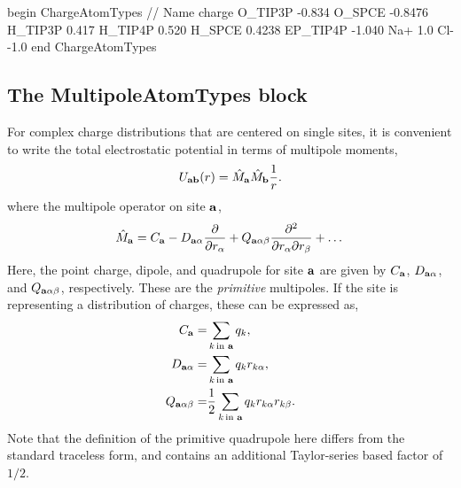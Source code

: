 \documentclass[]{book}
\begin{document}
\begin{code}[caption={[An example of a ChargeAtomTypes block.] A
simple example of a ChargeAtomTypes block.   Units for
charge are in multiples of electron charge.},
label={sch:ChargeAtomTypesBlock}]
begin ChargeAtomTypes
// Name         charge
O_TIP3P        -0.834
O_SPCE         -0.8476
H_TIP3P         0.417
H_TIP4P         0.520
H_SPCE          0.4238
EP_TIP4P       -1.040
Na+             1.0
Cl-            -1.0
end ChargeAtomTypes
\end{code}

\subsection{\label{section:ffMultipole}The MultipoleAtomTypes
  block}
For complex charge distributions that are centered on single sites, it
is convenient to write the total electrostatic potential in terms of
multipole moments,
\begin{equation}
U_{\bf{ab}}(r)=\hat{M}_{\bf a} \hat{M}_{\bf b} \frac{1}{r}  \label{kernel}.
\end{equation}
where the multipole operator on site $\bf a$,
\begin{equation}
\hat{M}_{\bf a} = C_{\bf a} - D_{{\bf a}\alpha} \frac{\partial}{\partial r_{\alpha}} 
+  Q_{{\bf a}\alpha\beta}
 \frac{\partial^2}{\partial r_{\alpha} \partial r_{\beta}} + \dots
\end{equation}
Here, the point charge, dipole, and quadrupole for site $\bf a$ are
given by $C_{\bf a}$, $D_{{\bf a}\alpha}$, and $Q_{{\bf
    a}\alpha\beta}$, respectively.  These are the {\it primitive}
multipoles.  If the site is representing a distribution of charges,
these can be expressed as,
\begin{align}
C_{\bf a} =&\sum_{k \, \text{in \bf a}} q_k , \label{eq:charge} \\
D_{{\bf a}\alpha} =&\sum_{k \, \text{in \bf a}} q_k r_{k\alpha}, \label{eq:dipole}\\
Q_{{\bf a}\alpha\beta} =& \frac{1}{2} \sum_{k \, \text{in \bf a}} q_k
r_{k\alpha}  r_{k\beta} . \label{eq:quadrupole}
\end{align}
Note that the definition of the primitive quadrupole here differs from
the standard traceless form, and contains an additional Taylor-series
based factor of $1/2$.  
\end{document}
